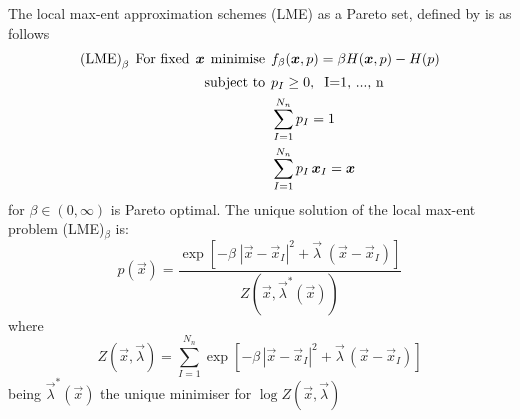 The local max-ent approximation schemes (LME) as a Pareto set,
defined by \cite{Arroyo2006} is as follows 
\begin{align*}
  \text{(LME)}_{\beta} \hspace{0.15cm} \text{For fixed} \hspace{0.15cm}
  \vec{x} \hspace{0.15cm} \text{minimise}  \nonumber \hspace{0.15cm} &f_{\beta}(\vec{x}, p) = \beta H(\vec{x},p) - H(p) \\
  \text{subject to} \hspace{0.15cm} &p_I \ge 0, \hspace{0.2cm} \text{I=1, ..., n}  \\
                                                                   &\sum_{I=1}^{N_n}{p_I} = 1 \\
                                                                   &\sum_{I=1}^{N_n}{p_I \, \vec{x}_I} = \vec{x}
\end{align*}
for $\beta \in (0,\infty)$ is Pareto optimal. The unique solution of
the local max-ent problem (LME)$_\beta$ is: 
\begin{equation}
  \label{eq:LME-p}
p(\vec{x})=\frac{\exp\left[ -\beta \; |\vec{x}-\vec{x}_I|^2 +  \vec{\lambda}  \;  (\vec{x}-\vec{x}_I)         \right] } {Z(\vec{x},\vec{\lambda}^*(\vec{x}))}
\end{equation}
where
\begin{equation}
  \label{eq:LME-Z}
Z(\vec{x}, {\vec{\lambda}}) = \sum_{I=1}^{N_n}{ \exp \left[ -\beta \, | \vec{x}-\vec{x}_I|^2 + \vec{\lambda}  \,  (\vec{x}-\vec{x}_I)  \right]}
\end{equation}
being $\vec{\lambda}^*(\vec{x})$ the unique minimiser  for $\log Z(\vec{x}, \vec{\lambda})$

